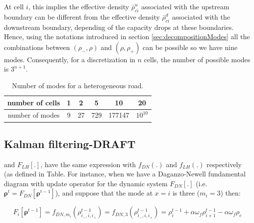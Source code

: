 At cell $i$, this implies the effective density $\bar{\rho}^{u}_{ci}$ associated with the upstream boundary can be different from the effective density $\bar{\rho}^{d}_{ci}$ associated with the downstream boundary, depending of the capacity drops at these boundaries. Hence, using the notations introduced in section \ref{sec:decompositionModes} all the combinations between $(\rho_{-},\rho)$ and $(\rho,\rho_{+})$ can be possible so we have nine modes. Consequently, for a discretization in $n$ cells, the number of possible modes is $3^{n+1}$.

\begin{table}[ht]
\centering %
\begin{tabular}{|c|c|c|c|c|c|}
  \hline
 number of cells & 1 & 2 & 5 & 10 & 20\\
  \hline
 number of modes & 9 & 27 & 729 & 177147 & $10^{10}$\\
  \hline
\end{tabular}
\label{table:numModes2} %
\caption{Number of modes for a heterogeneous road.}
\end{table}

\subsection{Kalman filtering-DRAFT}

and $F_{LH}[.]$, have the same expression with $f_{DN}(.)$ and $f_{LH}(.)$ respectively (as defined in Table. For instance, when we have a Daganzo-Newell fundamental diagram with update operator for the dynamic system $F_{DN}[.]$ (i.e. $\boldsymbol\rho^{t} = F_{DN}[\boldsymbol\rho^{t-1}]$), and suppose that the mode at $x=i$ is three ($m_{i}=3$) then\footnotemark: 

\begin{equation}
F_{i}[\boldsymbol\rho^{t-1}] = f_{DN,m_{i}}(\rho^{t-1}_{i_{-},i,i_{+}}) = f_{DN,3}(\rho^{t-1}_{i_{-},i,i_{+}}) = 
\rho^{t-1}_{i} + \alpha \omega_{f}\rho^{t-1}_{i+1} - \alpha \omega_{f}\rho_{c}
\label{eq:example}
\end{equation}


